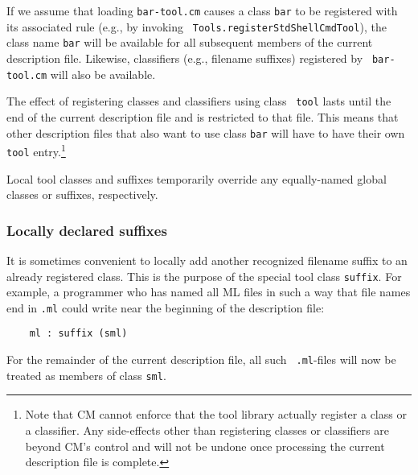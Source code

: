 If we assume that loading {\tt bar-tool.cm} causes a class {\tt bar}
to be registered with its associated rule (e.g., by invoking {\tt
Tools.registerStdShellCmdTool}), the class name {\tt bar} will be
available for all subsequent members of the current description file.
Likewise, classifiers (e.g., filename suffixes) registered by {\tt
bar-tool.cm} will also be available.

The effect of registering classes and classifiers using class {\tt
tool} lasts until the end of the current description file and is
restricted to that file.  This means that other description files that
also want to use class {\tt bar} will have to have their own {\tt
tool} entry.\footnote{Note that CM cannot enforce that the tool
library actually register a class or a classifier.  Any side-effects
other than registering classes or classifiers are beyond CM's control
and will not be undone once processing the current description file is
complete.}

Local tool classes and suffixes temporarily override any equally-named
global classes or suffixes, respectively.

\subsubsection{Locally declared suffixes}
\label{sec:localsuffixes}

It is sometimes convenient to locally add another recognized filename
suffix to an already registered class.  This is the purpose of the
special tool class {\tt suffix}.  For example, a programmer who has
named all ML files in such a way that file names end in {\tt .ml}
could write near the beginning of the description file:

\begin{lstlisting}
    ml : suffix (sml)
\end{lstlisting}%

For the remainder of the current description file, all such {\tt
.ml}-files will now be treated as members of class {\tt sml}.
